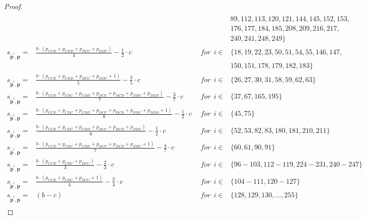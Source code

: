 \documentclass{article}
\theoremstyle{definition}
\begin{document}
\begin{proof}
{\begin{equation}
\begin{array}{lcll}
    \\ & & & 89,112, 113,120,121, 144,145,152,153,
    \\ & & & 176,177,184,185,208,209,216,217,
    \\ & & & 240, 241,248,249\} \\ 
    s_{\mathbf{\tilde{p}}^{i}, \mathbf{p}} = & \frac{b \cdot \left(p_{CCD} + p_{CDD} + p_{DCC} + p_{DDC}\right)}{4} - \frac{1}{2} \cdot c & ~~for~~ i \in & \{ 18, 19, 22, 23, 50, 51, 54, 55, 146, 147,
    \\ & & &  150, 151, 178, 179, 182, 183\} \\ 
    s_{\mathbf{\tilde{p}}^{i}, \mathbf{p}} = & \frac{b \cdot \left(p_{CCD} + p_{CDD} + p_{DCC} + p_{DDC} + 1\right)}{5} - \frac{3}{5} \cdot c & ~~for~~ i \in & \{ 26, 27, 30, 31, 58, 59, 62, 63\} \\ [0.2cm]
    s_{\mathbf{\tilde{p}}^{i}, \mathbf{p}} = & \frac{b \cdot \left(p_{CCD} + p_{CDC} + p_{CDD} + p_{DCC} + p_{DCD} + p_{DDC} + p_{DDD}\right)}{7}  - \frac{3}{7} \cdot c& ~~for~~ i \in & \{ 37, 67, 165, 195\} \\ [0.2cm]
    s_{\mathbf{\tilde{p}}^{i}, \mathbf{p}} = & \frac{b \cdot \left(p_{CCD} + p_{CDC} + p_{CDD} + p_{DCC} + p_{DCD} + p_{DDC} + p_{DDD} + 1\right)}{8} - \frac{1}{2} \cdot c & ~~for~~ i \in & \{ 45, 75\} \\ [0.2cm]
    s_{\mathbf{\tilde{p}}^{i}, \mathbf{p}} = & \frac{b \cdot \left(p_{CCD} + p_{CDC} + p_{CDD} + p_{DCC} + p_{DCD} + p_{DDC}\right)}{6} - \frac{1}{2} \cdot c & ~~for~~ i \in & \{ 52, 53, 82, 83, 180, 181, 210, 211\} \\  [0.2cm]
    s_{\mathbf{\tilde{p}}^{i}, \mathbf{p}} = & \frac{b \cdot \left(p_{CCD} + p_{CDC} + p_{CDD} + p_{DCC} + p_{DCD} + p_{DDC} + 1\right)}{7} - \frac{4}{7} \cdot c & ~~for~~ i \in & \{ 60, 61, 90, 91\} \\ [0.2cm]
    s_{\mathbf{\tilde{p}}^{i}, \mathbf{p}} = & \frac{b \cdot \left(p_{CCD} + p_{CDC} + p_{DCC}\right)}{3} - \frac{2}{3} \cdot c & ~~for~~ i \in & \{ 96\!- \!103, 112\!- \!119, 224\!- \!231, 240\!- \!247\} \\ [0.2cm]
    s_{\mathbf{\tilde{p}}^{i}, \mathbf{p}} = & \frac{b \cdot \left(p_{CCD} + p_{CDC} + p_{DCC} + 1\right)}{4} - \frac{3}{4} \cdot c & ~~for~~ i \in & \{ 104\!-\!111, 120\!- \!127\} \\ [0.2cm]
    s_{\mathbf{\tilde{p}}^{i}, \mathbf{p}} = & (b - c) & ~~for~~ i \in & \{128, 129, 130, \dots, 255\} \\
\end{array}
\end{equation}}


\end{proof}
\end{document}
